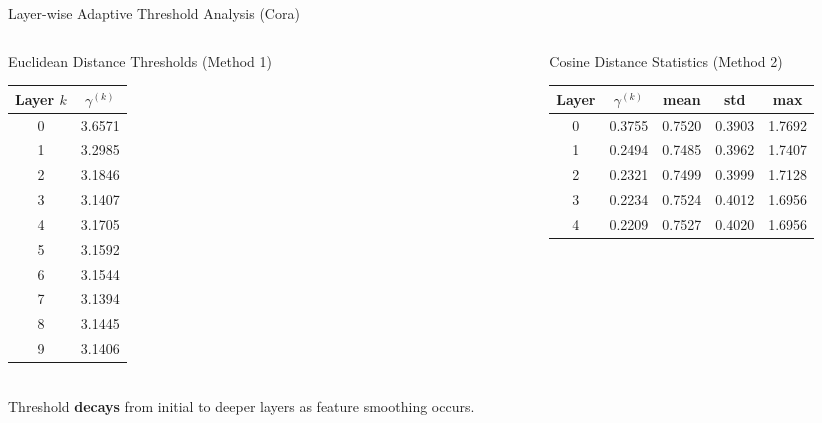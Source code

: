 \documentclass[aspectratio=169]{beamer}
\begin{document}
\begin{frame}{Layer-wise Adaptive Threshold Analysis (Cora)}
  \tiny
  \begin{columns}[T]
    \begin{column}{0.48\textwidth}
      \begin{block}{Euclidean Distance Thresholds (Method 1)}
        
        \small
        \begin{tabular}{cc}
          \toprule
          \textbf{Layer $k$} & \textbf{$\gamma^{(k)}$} \\
          \midrule
          0 & 3.6571 \\
          1 & 3.2985 \\
          2 & 3.1846 \\
          3 & 3.1407 \\
          4 & 3.1705 \\
          5 & 3.1592 \\
          6 & 3.1544 \\
          7 & 3.1394 \\
          8 & 3.1445 \\
          9 & 3.1406 \\
          \bottomrule
        \end{tabular}
        \vspace{4pt}\\
        \small Threshold \textbf{decays} from initial to deeper layers as feature smoothing occurs.
      \end{block}
    \end{column}
    \begin{column}{0.48\textwidth}
      \begin{block}{Cosine Distance Statistics (Method 2)}
        \vspace{4pt}
        \tiny
        \begin{tabular}{ccccc}
          \toprule
          \textbf{Layer} & $\gamma^{(k)}$ & \textbf{mean} & \textbf{std} & \textbf{max} \\
          \midrule
          0 & 0.3755 & 0.7520 & 0.3903 & 1.7692 \\
          1 & 0.2494 & 0.7485 & 0.3962 & 1.7407 \\
          2 & 0.2321 & 0.7499 & 0.3999 & 1.7128 \\
          3 & 0.2234 & 0.7524 & 0.4012 & 1.6956 \\
          4 & 0.2209 & 0.7527 & 0.4020 & 1.6956 \\

\end{tabular}
\end{block}
\end{column}
\end{columns}
\end{frame}
\end{document}
